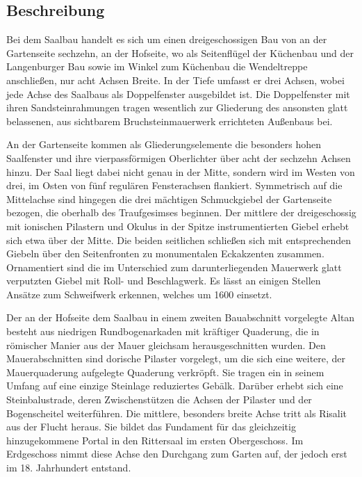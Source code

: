 \documentclass[
  letterpaper,
]{book}
\begin{document}
\subsection{Beschreibung}\label{beschreibung-1}

Bei dem Saalbau handelt es sich um einen dreigeschossigen Bau von an der
Gartenseite sechzehn, an der Hofseite, wo als Seitenflügel der Küchenbau
und der Langenburger Bau sowie im Winkel zum Küchenbau die Wendeltreppe
anschließen, nur acht Achsen Breite. In der Tiefe umfasst er drei
Achsen, wobei jede Achse des Saalbaus als Doppelfenster ausgebildet ist.
Die Doppelfenster mit ihren Sandsteinrahmungen tragen wesentlich zur
Gliederung des ansonsten glatt belassenen, aus sichtbarem
Bruchsteinmauerwerk errichteten Außenbaus bei.

An der Gartenseite kommen als Gliederungselemente die besonders hohen
Saalfenster und ihre vierpassförmigen Oberlichter über acht der sechzehn
Achsen hinzu. Der Saal liegt dabei nicht genau in der Mitte, sondern
wird im Westen von drei, im Osten von fünf regulären Fensterachsen
flankiert. Symmetrisch auf die Mittelachse sind hingegen die drei
mächtigen Schmuckgiebel der Gartenseite bezogen, die oberhalb des
Traufgesimses beginnen. Der mittlere der dreigeschossig mit ionischen
Pilastern und Okulus in der Spitze instrumentierten Giebel erhebt sich
etwa über der Mitte. Die beiden seitlichen schließen sich mit
entsprechenden Giebeln über den Seitenfronten zu monumentalen
Eckakzenten zusammen. Ornamentiert sind die im Unterschied zum
darunterliegenden Mauerwerk glatt verputzten Giebel mit Roll- und
Beschlagwerk. Es lässt an einigen Stellen Ansätze zum Schweifwerk
erkennen, welches um 1600 einsetzt.

Der an der Hofseite dem Saalbau in einem zweiten Bauabschnitt vorgelegte
Altan besteht aus niedrigen Rundbogenarkaden mit kräftiger Quaderung,
die in römischer Manier aus der Mauer gleichsam herausgeschnitten
wurden. Den Mauerabschnitten sind dorische Pilaster vorgelegt, um die
sich eine weitere, der Mauerquaderung aufgelegte Quaderung verkröpft.
Sie tragen ein in seinem Umfang auf eine einzige Steinlage reduziertes
Gebälk. Darüber erhebt sich eine Steinbalustrade, deren Zwischenstützen
die Achsen der Pilaster und der Bogenscheitel weiterführen. Die
mittlere, besonders breite Achse tritt als Risalit aus der Flucht
heraus. Sie bildet das Fundament für das gleichzeitig hinzugekommene
Portal in den Rittersaal im ersten Obergeschoss. Im Erdgeschoss nimmt
diese Achse den Durchgang zum Garten auf, der jedoch erst im 18.
Jahrhundert entstand.
\end{document}
